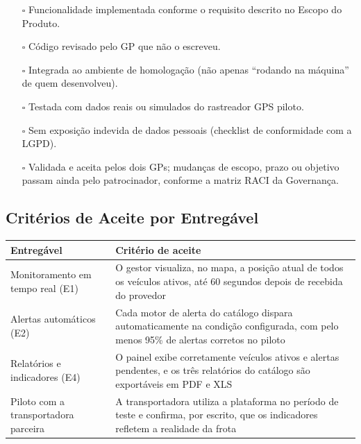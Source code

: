 \documentclass[11pt,a4paper]{article}
\newcommand{\dodbox}{$\square$}
\begin{document}
\begin{itemize}[itemsep=3pt]
  \item[\dodbox] Funcionalidade implementada conforme o requisito descrito no Escopo do Produto.
  \item[\dodbox] Código revisado pelo GP que não o escreveu.
  \item[\dodbox] Integrada ao ambiente de homologação (não apenas ``rodando na máquina'' de quem desenvolveu).
  \item[\dodbox] Testada com dados reais ou simulados do rastreador GPS piloto.
  \item[\dodbox] Sem exposição indevida de dados pessoais (checklist de conformidade com a LGPD).
  \item[\dodbox] Validada e aceita pelos dois GPs; mudanças de escopo, prazo ou objetivo passam ainda pelo patrocinador, conforme a matriz RACI da Governança.
\end{itemize}

\subsection{Critérios de Aceite por Entregável}
\begin{center}
\begin{tabularx}{\textwidth}{L L}
\toprule
\textbf{Entregável} & \textbf{Critério de aceite} \\
\midrule
Monitoramento em tempo real (E1) & O gestor visualiza, no mapa, a posição atual de todos os veículos ativos, até 60 segundos depois de recebida do provedor \\
Alertas automáticos (E2) & Cada motor de alerta do catálogo dispara automaticamente na condição configurada, com pelo menos 95\% de alertas corretos no piloto \\
Relatórios e indicadores (E4) & O painel exibe corretamente veículos ativos e alertas pendentes, e os três relatórios do catálogo são exportáveis em PDF e XLS \\
Piloto com a transportadora parceira & A transportadora utiliza a plataforma no período de teste e confirma, por escrito, que os indicadores refletem a realidade da frota \\
\bottomrule
\end{tabularx}
\end{center}
\end{document}
